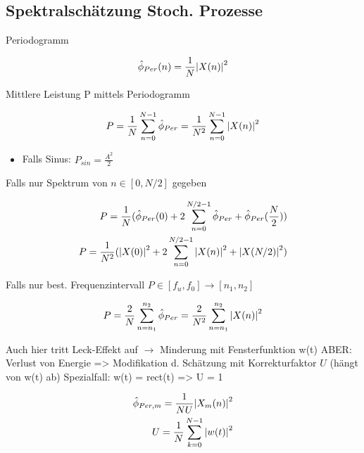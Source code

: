 \documentclass[10pt,a4paper]{article}
\begin{document}
\subsection{Spektralschätzung Stoch. Prozesse}
Periodogramm
  \begin{mdframed}[style=exercise]
    \begin{align}
        \hat{\phi}_{Per}(n) = \frac{1}{N}\abs{X(n)}^2
    \end{align}
  \end{mdframed}
Mittlere Leistung P mittels Periodogramm
  \begin{mdframed}[style=exercise]
    \begin{align}
        P = \frac{1}{N}\sum_{n=0}^{N-1} \hat{\phi}_{Per} = \frac{1}{N^2}\sum_{n=0}^{N-1} \abs{X(n)}^2
    \end{align}
  \end{mdframed}
\begin{itemize}
    \item Falls Sinus: $P_{sin}=\frac{A^2}{2}$
\end{itemize}
Falls nur Spektrum von $n\in [0,N/2]$ gegeben
  \begin{mdframed}[style=exercise]
    \begin{align}
        P = \frac{1}{N}( \hat{\phi}_{Per}(0) + 2 \sum_{n=0}^{N/2-1} \hat{\phi}_{Per} + \hat{\phi}_{Per}(\frac{N}{2})) \\
        P = \frac{1}{N^2}( \abs{X(0)}^2 + 2 \sum_{n=0}^{N/2-1} \abs{X(n)}^2 + \abs{X(N/2)}^2) 
    \end{align}
  \end{mdframed}
Falls nur best. Frequenzintervall $P\in [f_u,f_0] \rightarrow [n_1,n_2]$ 
  \begin{mdframed}[style=exercise]
    \begin{align}
        P = \frac{2}{N}\sum_{n=n_1}^{n_2} \hat{\phi}_{Per} = \frac{2}{N^2}\sum_{n=n_1}^{n_2} \abs{X(n)}^2
    \end{align}
  \end{mdframed}
Auch hier tritt Leck-Effekt auf $\rightarrow$ Minderung mit Fensterfunktion w(t) 
ABER: Verlust von Energie => Modifikation d. Schätzung mit Korrekturfaktor $U$ (hängt von w(t) ab)
Spezialfall: w(t) = rect(t) => U = 1 
  \begin{mdframed}[style=exercise]
    \begin{align}
        \hat{\phi}_{Per,m} = \frac{1}{NU}\abs{X_m(n)}^2\\
        U = \frac{1}{N}\sum_{k=0}^{N-1} \abs{w(t)}^2 
    \end{align}
  \end{mdframed}
\end{document}
